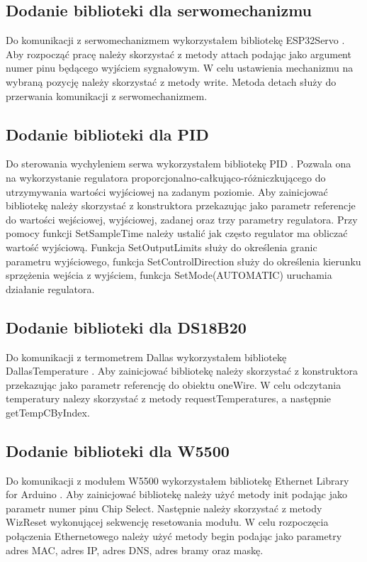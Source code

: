 \documentclass[11pt]{report}
\begin{document}
 \subsection{Dodanie biblioteki dla serwomechanizmu}
 Do komunikacji z serwomechanizmem wykorzystałem bibliotekę ESP32Servo \cite{Servolibrary}. Aby rozpocząć pracę należy skorzystać z metody attach podając jako argument numer pinu będącego wyjściem sygnałowym. W celu ustawienia mechanizmu na wybraną pozycję należy skorzystać z metody write. Metoda detach służy do przerwania komunikacji z serwomechanizmem.
 \subsection{Dodanie biblioteki dla PID}
 Do sterowania wychyleniem serwa wykorzystałem bibliotekę PID \cite{PIDlibrary}. Pozwala ona na wykorzystanie regulatora proporcjonalno-całkująco-różniczkującego do utrzymywania wartości wyjściowej na zadanym poziomie.
 Aby zainicjować bibliotekę  należy skorzystać z konstruktora przekazując jako parametr referencje do wartości wejściowej, wyjściowej, zadanej oraz trzy parametry regulatora. Przy pomocy funkcji SetSampleTime należy ustalić jak często regulator ma obliczać wartość wyjściową. Funkcja SetOutputLimits służy do określenia granic parametru wyjściowego, funkcja SetControlDirection służy do określenia kierunku sprzężenia wejścia z wyjściem, funkcja SetMode(AUTOMATIC) uruchamia działanie regulatora.
 \subsection{Dodanie biblioteki dla DS18B20}
 Do komunikacji z termometrem Dallas wykorzystałem bibliotekę DallasTemperature \cite{dallaslibrary}. Aby zainicjować bibliotekę należy skorzystać z konstruktora przekazując jako parametr referencję do obiektu oneWire. W celu odczytania temperatury nalezy skorzystać z metody requestTemperatures, a następnie getTempCByIndex.
 \subsection{Dodanie biblioteki dla W5500}
 Do komunikacji z modułem W5500 wykorzystałem bibliotekę Ethernet Library for Arduino \cite{ethernetlibrary}. Aby zainicjować bibliotekę należy użyć metody init podając jako parametr numer pinu Chip Select. Następnie należy skorzystać z metody WizReset wykonującej sekwencję resetowania modułu. W celu rozpoczęcia połączenia Ethernetowego należy użyć metody begin podając jako parametry adres MAC, adres IP, adres DNS, adres bramy oraz maskę.
\end{document}
